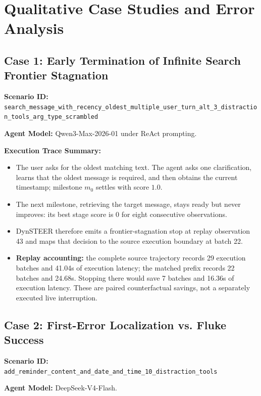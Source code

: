 \section{Qualitative Case Studies and Error Analysis}
\label{app:case_studies}

\subsection{Case 1: Early Termination of Infinite Search Frontier Stagnation}
\textbf{Scenario ID:} \\
\null\hspace*{1.5em}\nolinkurl{search_message_with_recency_oldest_multiple_user_turn_alt_3_distraction_tools_arg_type_scrambled}

\textbf{Agent Model:} Qwen3-Max-2026-01 under ReAct prompting.

\textbf{Execution Trace Summary:}
\begin{itemize}[leftmargin=*,itemsep=1pt]
    \item The user asks for the oldest matching text. The agent asks one clarification, learns that the oldest message is required, and then obtains the current timestamp; milestone $m_0$ settles with score $1.0$.
    \item The next milestone, retrieving the target message, stays ready but never improves: its best stage score is $0$ for eight consecutive observations.
    \item DynSTEER therefore emits a frontier-stagnation stop at replay observation 43 and maps that decision to the source execution boundary at batch 22.
    \item \textbf{Replay accounting:} the complete source trajectory records 29 execution batches and 41.04s of execution latency; the matched prefix records 22 batches and 24.68s. Stopping there would save 7 batches and 16.36s of execution latency. These are paired counterfactual savings, not a separately executed live interruption.
\end{itemize}

\subsection{Case 2: First-Error Localization vs. Fluke Success}
\textbf{Scenario ID:} \\
\null\hspace*{1.5em}\nolinkurl{add_reminder_content_and_date_and_time_10_distraction_tools}

\textbf{Agent Model:} DeepSeek-V4-Flash.

